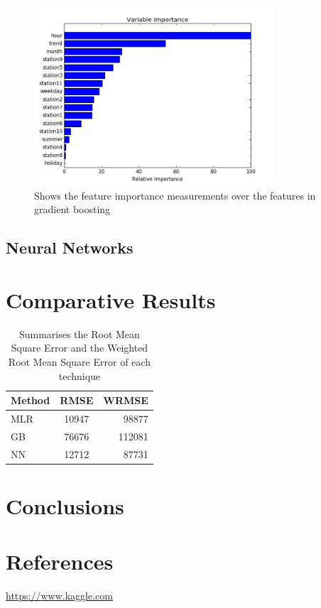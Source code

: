 \documentclass{article} %
\begin{document}
\begin{figure}[H]
  \centering
    \includegraphics[width=0.80\textwidth]{boost_imp}
  \caption{Shows the feature importance measurements over the features in gradient boosting}
  \label{fig:boost_imp}
\end{figure}


\subsection*{Neural Networks}

\section*{Comparative Results}

\begin{table}
  \begin{tabular}{l c r}
    Method  & RMSE & WRMSE \\
    \hline
    MLR     & 10947 & 98877 \\
    GB      & 76676 & 112081 \\
    NN      & 12712 & 87731 \\
  \end{tabular}
  \caption{Summarises the Root Mean Square Error and the Weighted Root Mean Square Error of each technique}
  \label{tab:error_comp}
\end{table}
\section*{Conclusions}


\section*{References}
\url{https://www.kaggle.com}
\end{document}

